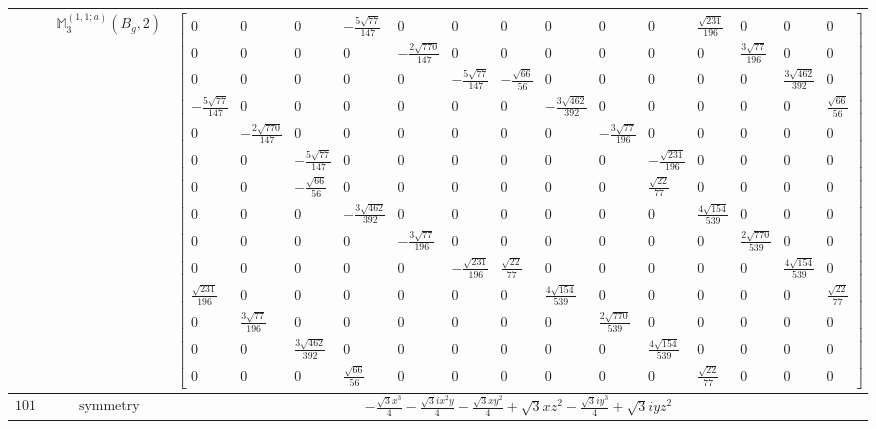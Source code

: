 \documentclass[fleqn,8pt,landscape]{jsarticle}
\begin{document}
\begin{longtable}{ccc}
$  $ & $ \mathbb{M}_{3}^{(1,1;a)}(B_{g},2) $ & $ \begin{bmatrix} 0 & 0 & 0 & - \frac{5 \sqrt{77}}{147} & 0 & 0 & 0 & 0 & 0 & 0 & \frac{\sqrt{231}}{196} & 0 & 0 & 0 \\ 0 & 0 & 0 & 0 & - \frac{2 \sqrt{770}}{147} & 0 & 0 & 0 & 0 & 0 & 0 & \frac{3 \sqrt{77}}{196} & 0 & 0 \\ 0 & 0 & 0 & 0 & 0 & - \frac{5 \sqrt{77}}{147} & - \frac{\sqrt{66}}{56} & 0 & 0 & 0 & 0 & 0 & \frac{3 \sqrt{462}}{392} & 0 \\ - \frac{5 \sqrt{77}}{147} & 0 & 0 & 0 & 0 & 0 & 0 & - \frac{3 \sqrt{462}}{392} & 0 & 0 & 0 & 0 & 0 & \frac{\sqrt{66}}{56} \\ 0 & - \frac{2 \sqrt{770}}{147} & 0 & 0 & 0 & 0 & 0 & 0 & - \frac{3 \sqrt{77}}{196} & 0 & 0 & 0 & 0 & 0 \\ 0 & 0 & - \frac{5 \sqrt{77}}{147} & 0 & 0 & 0 & 0 & 0 & 0 & - \frac{\sqrt{231}}{196} & 0 & 0 & 0 & 0 \\ 0 & 0 & - \frac{\sqrt{66}}{56} & 0 & 0 & 0 & 0 & 0 & 0 & \frac{\sqrt{22}}{77} & 0 & 0 & 0 & 0 \\ 0 & 0 & 0 & - \frac{3 \sqrt{462}}{392} & 0 & 0 & 0 & 0 & 0 & 0 & \frac{4 \sqrt{154}}{539} & 0 & 0 & 0 \\ 0 & 0 & 0 & 0 & - \frac{3 \sqrt{77}}{196} & 0 & 0 & 0 & 0 & 0 & 0 & \frac{2 \sqrt{770}}{539} & 0 & 0 \\ 0 & 0 & 0 & 0 & 0 & - \frac{\sqrt{231}}{196} & \frac{\sqrt{22}}{77} & 0 & 0 & 0 & 0 & 0 & \frac{4 \sqrt{154}}{539} & 0 \\ \frac{\sqrt{231}}{196} & 0 & 0 & 0 & 0 & 0 & 0 & \frac{4 \sqrt{154}}{539} & 0 & 0 & 0 & 0 & 0 & \frac{\sqrt{22}}{77} \\ 0 & \frac{3 \sqrt{77}}{196} & 0 & 0 & 0 & 0 & 0 & 0 & \frac{2 \sqrt{770}}{539} & 0 & 0 & 0 & 0 & 0 \\ 0 & 0 & \frac{3 \sqrt{462}}{392} & 0 & 0 & 0 & 0 & 0 & 0 & \frac{4 \sqrt{154}}{539} & 0 & 0 & 0 & 0 \\ 0 & 0 & 0 & \frac{\sqrt{66}}{56} & 0 & 0 & 0 & 0 & 0 & 0 & \frac{\sqrt{22}}{77} & 0 & 0 & 0 \end{bmatrix} $ \\ \hline
$ 1010 $ & $ \text{symmetry} $ & $ - \frac{\sqrt{3} x^{3}}{4} - \frac{\sqrt{3} i x^{2} y}{4} - \frac{\sqrt{3} x y^{2}}{4} + \sqrt{3} x z^{2} - \frac{\sqrt{3} i y^{3}}{4} + \sqrt{3} i y z^{2} $ \\

\end{longtable}
\end{document}
